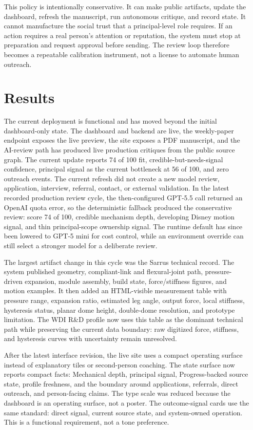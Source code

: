 \documentclass[12pt,letterpaper]{article}
\begin{document}
This policy is intentionally conservative. It can make public artifacts, update the dashboard, refresh the manuscript, run autonomous critique, and record state. It cannot manufacture the social trust that a principal-level role requires. If an action requires a real person's attention or reputation, the system must stop at preparation and request approval before sending. The review loop therefore becomes a repeatable calibration instrument, not a license to automate human outreach.

\section{Results}

The current deployment is functional and has moved beyond the initial dashboard-only state. The dashboard and backend are live, the weekly-paper endpoint exposes the live preview, the site exposes a PDF manuscript, and the AI-review path has produced live production critiques from the public source graph. The current update reports 74 of 100 fit, credible-but-needs-signal confidence, principal signal as the current bottleneck at 56 of 100, and zero outreach events. The current refresh did not create a new model review, application, interview, referral, contact, or external validation. In the latest recorded production review cycle, the then-configured GPT-5.5 call returned an OpenAI quota error, so the deterministic fallback produced the conservative review: score 74 of 100, credible mechanism depth, developing Disney motion signal, and thin principal-scope ownership signal. The runtime default has since been lowered to GPT-5 mini for cost control, while an environment override can still select a stronger model for a deliberate review.

The largest artifact change in this cycle was the Sarrus technical record. The system published geometry, compliant-link and flexural-joint path, pressure-driven expansion, module assembly, build state, force/stiffness figures, and motion examples. It then added an HTML-visible measurement table with pressure range, expansion ratio, estimated leg angle, output force, local stiffness, hysteresis status, planar dome height, double-dome resolution, and prototype limitation. The WDI R\&D profile now uses this table as the dominant technical path while preserving the current data boundary: raw digitized force, stiffness, and hysteresis curves with uncertainty remain unresolved.

After the latest interface revision, the live site uses a compact operating surface instead of explanatory tiles or second-person coaching. The state surface now reports compact facts: Mechanical depth, principal signal, Progress-backed source state, profile freshness, and the boundary around applications, referrals, direct outreach, and person-facing claims. The type scale was reduced because the dashboard is an operating surface, not a poster. The outcome-signal cards use the same standard: direct signal, current source state, and system-owned operation. This is a functional requirement, not a tone preference.
\end{document}

